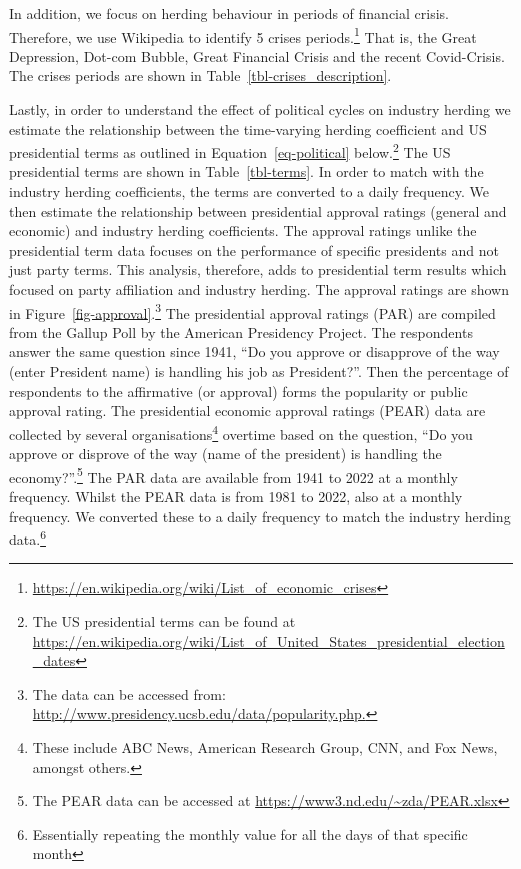 \documentclass[
  letterpaper,
  DIV=11,
  numbers=noendperiod]{scrartcl}
\begin{document}
In addition, we focus on herding behaviour in periods of financial
crisis. Therefore, we use Wikipedia to identify 5 crises
periods.\footnote{\url{https://en.wikipedia.org/wiki/List_of_economic_crises}}
That is, the Great Depression, Dot-com Bubble, Great Financial Crisis
and the recent Covid-Crisis. The crises periods are shown in
Table~\ref{tbl-crises_description}.

Lastly, in order to understand the effect of political cycles on
industry herding we estimate the relationship between the time-varying
herding coefficient and US presidential terms as outlined in
Equation~\ref{eq-political} below.\footnote{The US presidential terms
  can be found at
  \url{https://en.wikipedia.org/wiki/List_of_United_States_presidential_election_dates}}
The US presidential terms are shown in Table~\ref{tbl-terms}. In order
to match with the industry herding coefficients, the terms are converted
to a daily frequency. We then estimate the relationship between
presidential approval ratings (general and economic) and industry
herding coefficients. The approval ratings unlike the presidential term
data focuses on the performance of specific presidents and not just
party terms. This analysis, therefore, adds to presidential term results
which focused on party affiliation and industry herding. The approval
ratings are shown in Figure~\ref{fig-approval}.\footnote{The data can be
  accessed from:
  \url{http://www.presidency.ucsb.edu/data/popularity.php.}} The
presidential approval ratings (PAR) are compiled from the Gallup Poll by
the American Presidency Project. The respondents answer the same
question since 1941, ``Do you approve or disapprove of the way (enter
President name) is handling his job as President?''. Then the percentage
of respondents to the affirmative (or approval) forms the popularity or
public approval rating. The presidential economic approval ratings
(PEAR) data are collected by several organisations\footnote{These
  include ABC News, American Research Group, CNN, and Fox News, amongst
  others.} overtime based on the question, ``Do you approve or disprove
of the way (name of the president) is handling the
economy?''.\footnote{The PEAR data can be accessed at
  \url{https://www3.nd.edu/~zda/PEAR.xlsx}} The PAR data are available
from 1941 to 2022 at a monthly frequency. Whilst the PEAR data is from
1981 to 2022, also at a monthly frequency. We converted these to a daily
frequency to match the industry herding data.\footnote{Essentially
  repeating the monthly value for all the days of that specific month}
\end{document}
